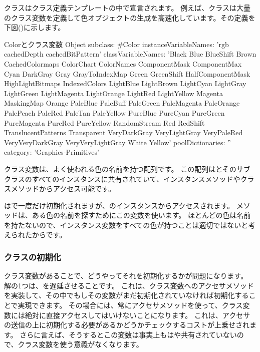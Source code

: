 \documentclass[a4paper,10pt,twoside]{book}
\begin{document}
クラスはクラス定義テンプレートの中で宣言されます。
例えば、クラスは大量のクラス変数を定義して色オブジェクトの生成を高速化しています。その定義を下図()に示します。
\begin{classdef}[Color]{Colorとクラス変数}
Object subclass: #Color 	
        instanceVariableNames: 'rgb cachedDepth cachedBitPattern'
        classVariableNames: 'Black Blue BlueShift Brown CachedColormaps ColorChart ColorNames ComponentMask ComponentMax Cyan DarkGray Gray GrayToIndexMap Green GreenShift HalfComponentMask HighLightBitmaps IndexedColors LightBlue LightBrown LightCyan LightGray LightGreen LightMagenta LightOrange LightRed LightYellow Magenta MaskingMap Orange PaleBlue PaleBuff PaleGreen PaleMagenta PaleOrange PalePeach PaleRed PaleTan PaleYellow PureBlue PureCyan PureGreen PureMagenta PureRed PureYellow RandomStream Red RedShift TranslucentPatterns Transparent VeryDarkGray VeryLightGray VeryPaleRed VeryVeryDarkGray VeryVeryLightGray White Yellow'
        poolDictionaries: '' 	
        category: 'Graphics-Primitives'
\end{classdef}

クラス変数は、よく使われる色の名前を持つ配列です。
この配列はとそのサブクラスのすべてのインスタンスに共有されていて、インスタンスメソッドやクラスメソッドからアクセス可能です。%

はで一度だけ初期化されますが、のインスタンスからアクセスされます。
メソッドは、ある色の名前を探すためにこの変数を使います。
ほとんどの色は名前を持たないので、インスタンス変数をすべての色が持つことは適切ではないと考えられたからです。

\subsubsection{クラスの初期化}

クラス変数があることで、どうやってそれを初期化するかが問題になります。
解の1つは、を遅延させることです。
これは、クラス変数へのアクセサメソッドを実装して、その中でもしその変数がまだ初期化されていなければ初期化することで実現できます。
その場合には、常にアクセサメソッドを使って、クラス変数には絶対に直接アクセスしてはいけないことになります。
これは、アクセサの送信の上に初期化する必要があるかどうかチェックするコストが上乗せされます。
さらに言えば、そうするとこの変数は事実上もはや共有されていないので、クラス変数を使う意義がなくなります。
\end{document}
